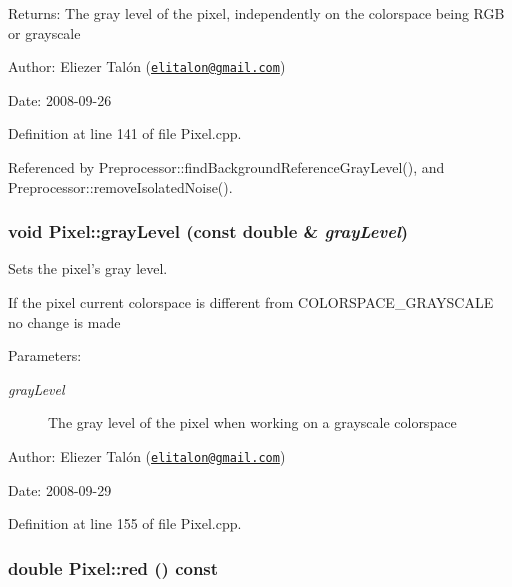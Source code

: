 \begin{Desc}
\item[Returns:]The gray level of the pixel, independently on the colorspace being RGB or grayscale\end{Desc}
\begin{Desc}
\item[Author:]Eliezer Talón (\href{mailto:elitalon@gmail.com}{\tt elitalon@gmail.com}) \end{Desc}
\begin{Desc}
\item[Date:]2008-09-26 \end{Desc}


Definition at line 141 of file Pixel.cpp.

Referenced by Preprocessor::findBackgroundReferenceGrayLevel(), and Preprocessor::removeIsolatedNoise().\hypertarget{class_pixel_5f287c6a53167076bc8f1ce54e74e38d}{
\subsubsection[grayLevel]{\setlength{\rightskip}{0pt plus 5cm}void Pixel::grayLevel (const double \& {\em grayLevel})}}
\label{class_pixel_5f287c6a53167076bc8f1ce54e74e38d}


Sets the pixel's gray level. 

If the pixel current colorspace is different from COLORSPACE\_\-GRAYSCALE no change is made

\begin{Desc}
\item[Parameters:]
\begin{description}
\item[{\em grayLevel}]The gray level of the pixel when working on a grayscale colorspace\end{description}
\end{Desc}
\begin{Desc}
\item[Author:]Eliezer Talón (\href{mailto:elitalon@gmail.com}{\tt elitalon@gmail.com}) \end{Desc}
\begin{Desc}
\item[Date:]2008-09-29 \end{Desc}


Definition at line 155 of file Pixel.cpp.\hypertarget{class_pixel_52542702e90cafc9c29713c23cd35e8f}{
\subsubsection[red]{\setlength{\rightskip}{0pt plus 5cm}double Pixel::red () const}}
\label{class_pixel_52542702e90cafc9c29713c23cd35e8f}


